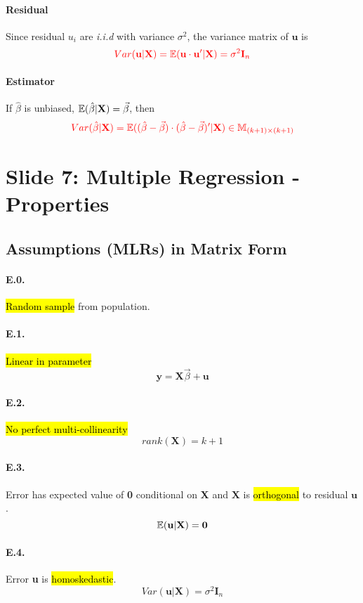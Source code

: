 \documentclass[]{article}
\begin{document}
    			\paragraph{Residual} Since residual $u_i$ are \emph{i.i.d} with variance $\sigma^2$, the variance matrix of $\textbf{u}$ is
    			\[\textcolor{red}{
    				Var(\textbf{u}|\textbf{X}) = \mathbb{E}({\textbf{u} \cdot \textbf{u}'|\textbf{X}}) = \sigma^2 \textbf{I}_n
    			}\]
    			
    			\paragraph{Estimator} If $\hat{\beta}$ is unbiased, $\mathbb{E}({\hat{\beta} | \textbf{X}}) = \vec{\beta}$, then 
    			\[\textcolor{red}{
    				Var(\hat{\beta}|\textbf{X}) = \mathbb{E}({(\hat{\beta} - \vec{\beta})\cdot(\hat{\beta} - \vec{\beta})' | \textbf{X}}) \in \mathbb{M}_{(k+1) \times (k+1)}
    			}\]
    \section{Slide 7: Multiple Regression - Properties}
    	\subsection{Assumptions (MLRs) in Matrix Form}
    		\paragraph{E.0.} \hl{Random sample} from population.
    		\paragraph{E.1.} \hl{Linear in parameter}
    		\[
    			\textbf{y} = \textbf{X}\vec{\beta} + \textbf{u}
    		\]
    		\paragraph{E.2.} \hl{No perfect multi-collinearity}
    		\[
    			rank(\textbf{X}) = k +1
    		\]
    		\paragraph{E.3.} Error has expected value of \textbf{0} conditional on \textbf{X} and $\textbf{X}$ is \hl{orthogonal} to residual $\textbf{u}$.
    		\[
    			\mathbb{E}({\textbf{u}|\textbf{X}}) = \textbf{0}
    		\]
    		\paragraph{E.4.} Error \textbf{u} is \hl{homoskedastic}.
    		\[
    			Var(\textbf{u}|\textbf{X}) = \sigma^2 \textbf{I}_n
    		\]
\end{document}
